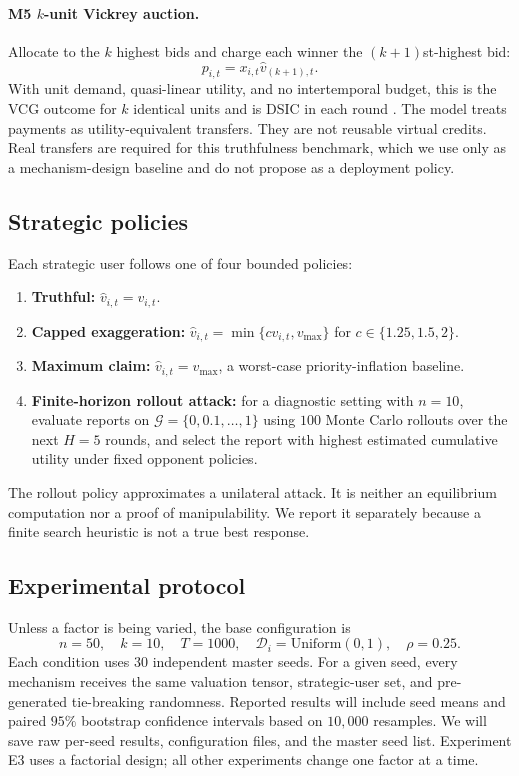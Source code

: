 \documentclass{article}
\begin{document}
\paragraph{M5 $k$-unit Vickrey auction.}
Allocate to the $k$ highest bids and charge each winner the
$(k+1)$st-highest bid:
\[
  p_{i,t}=x_{i,t}\hat v_{(k+1),t}.
\]
With unit demand, quasi-linear utility, and no intertemporal budget, this is the
VCG outcome for $k$ identical units and is DSIC in each round
\cite{vickrey1961counterspeculation,nisan2007algorithmic}. The model treats
payments as utility-equivalent transfers. They are not reusable virtual
credits. Real transfers are required for this truthfulness benchmark, which we
use only as a mechanism-design baseline and do not propose as a deployment
policy.

\subsection{Strategic policies}

Each strategic user follows one of four bounded policies:
\begin{enumerate}
  \item \textbf{Truthful:}
        $\hat v_{i,t}=v_{i,t}$.
  \item \textbf{Capped exaggeration:}
        $\hat v_{i,t}=\min\{c v_{i,t},v_{\max}\}$ for
        $c\in\{1.25,1.5,2\}$.
  \item \textbf{Maximum claim:}
        $\hat v_{i,t}=v_{\max}$, a worst-case priority-inflation baseline.
  \item \textbf{Finite-horizon rollout attack:}
        for a diagnostic setting with $n=10$, evaluate reports on
        $\mathcal G=\{0,0.1,\ldots,1\}$ using $100$ Monte Carlo rollouts over
        the next $H=5$ rounds, and select the report with highest estimated
        cumulative utility under fixed opponent policies.
\end{enumerate}
The rollout policy approximates a unilateral attack. It is neither an
equilibrium computation nor a proof of manipulability. We report it separately
because a finite search heuristic is not a true best response.

\subsection{Experimental protocol}

Unless a factor is being varied, the base configuration is
\[
  n=50,\quad k=10,\quad T=1000,\quad
  \mathcal D_i=\mathrm{Uniform}(0,1),\quad \rho=0.25.
\]
Each condition uses $30$ independent master seeds. For a given seed, every
mechanism receives the same valuation tensor, strategic-user set, and
pre-generated tie-breaking randomness. Reported results will include seed
means and paired $95\%$ bootstrap confidence intervals based on $10{,}000$
resamples. We will save raw per-seed results, configuration files, and the
master seed list. Experiment E3 uses a factorial design; all other experiments
change one factor at a time.
\end{document}
